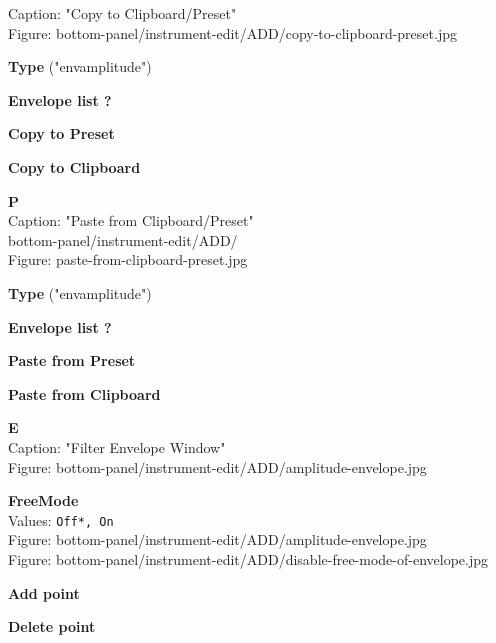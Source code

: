 \documentclass[
 11pt,
 twoside,
 a4paper,
 headinclude,
 footinclude,
 final                                 %
]{article}
\begin{document}
\begin{enumber}
\begin{enumber}
\begin{enumber}
\begin{enumber}
\begin{enumber}
                  Caption: "Copy to Clipboard/Preset" \\
                  Figure: bottom-panel/instrument-edit/ADD/copy-to-clipboard-preset.jpg
                  \begin{enumber}
                     \item \textbf{Type} ("envamplitude")
                     \item \textbf{Envelope list ?}
                     \item \textbf{Copy to Preset}
                     \item \textbf{Copy to Clipboard}
                  \end{enumber}
               \item \textbf{P} \\
                  Caption: "Paste from Clipboard/Preset" \\
                  bottom-panel/instrument-edit/ADD/ \\
                     Figure: paste-from-clipboard-preset.jpg
                  \begin{enumber}
                     \item \textbf{Type} ("envamplitude")
                     \item \textbf{Envelope list ?}
                     \item \textbf{Paste from Preset}
                     \item \textbf{Paste from Clipboard}
                  \end{enumber}
               \item \textbf{E} \\
                  Caption: "Filter Envelope Window" \\
                  Figure: bottom-panel/instrument-edit/ADD/amplitude-envelope.jpg
                  \begin{enumber}
                     \item \textbf{FreeMode} \\
                        Values: \texttt{Off*, On} \\
                        Figure: bottom-panel/instrument-edit/ADD/amplitude-envelope.jpg \\
                        Figure: bottom-panel/instrument-edit/ADD/disable-free-mode-of-envelope.jpg
                     \begin{enumber}
                        \item \textbf{Add point}
                        \item \textbf{Delete point}

\end{enumber}
\end{enumber}
\end{enumber}
\end{enumber}
\end{enumber}
\end{enumber}
\end{enumber}
\end{document}

